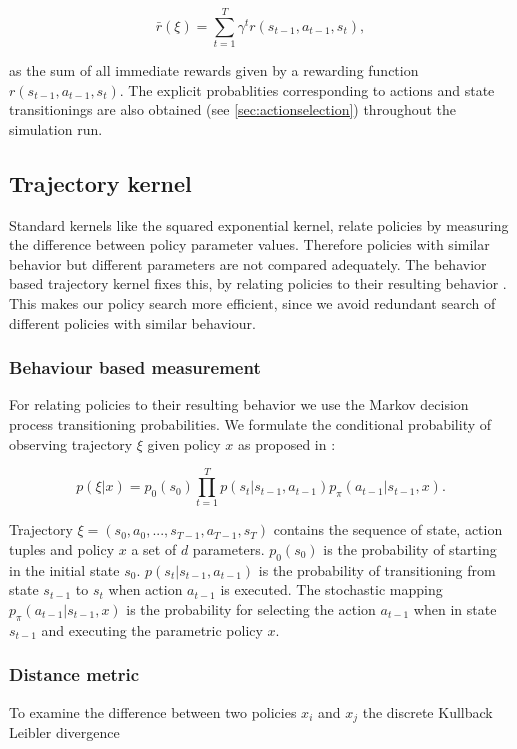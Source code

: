$$\bar{r}(\xi)=\sum_{t=1}^T \gamma^t r(s_{t-1}, a_{t-1}, s_{t}),$$

as the sum of all immediate rewards given by a rewarding function $r(s_{t-1}, a_{t-1}, s_{t})$. The explicit probablities corresponding to actions and state transitionings are also obtained (see \ref{sec:actionselection}) throughout the simulation run.

\subsection{Trajectory kernel}\label{sec:trajKernel}
Standard kernels like the squared exponential kernel, relate policies by measuring the difference between policy parameter values. Therefore policies with similar behavior but different parameters are not compared adequately. The behavior based trajectory kernel fixes this, by relating policies to their resulting behavior \cite{wilson2014using}. This makes our policy search more efficient, since we avoid redundant search of different policies with similar behaviour.

\subsubsection{Behaviour based measurement}

For relating policies to their resulting behavior we use the Markov decision process transitioning probabilities. We formulate the conditional probability of observing trajectory $\xi$ given policy $x$ as proposed in \cite{wilson2014using}:

$$p(\xi|x) = p_{0}(s_{0}) \prod_{t=1}^{T} p(s_{t}|s_{t-1}, a_{t-1}) p_{\pi}(a_{t-1}|s_{t-1}, x).$$

Trajectory $\xi=(s_{0},a_{0}, ..., s_{T-1}, a_{T-1}, s_{T})$ contains the sequence of state, action tuples and policy $x$ a set of $d$ parameters. $p_{0}(s_{0})$ is the probability of starting in the initial state $s_{0}$. $p(s_{t}|s_{t-1}, a_{t-1})$ is the probability of transitioning from state $s_{t-1}$ to $s_{t}$ when action $a_{t-1}$ is executed. The stochastic mapping $p_{\pi}(a_{t-1}|s_{t-1},x)$ is the probability for selecting the action $a_{t-1}$ when in state $s_{t-1}$ and executing the parametric policy $x$.

\subsubsection{Distance metric}
To examine the difference between two policies $x_{ i }$ and $x_{ j }$ the discrete Kullback Leibler divergence


